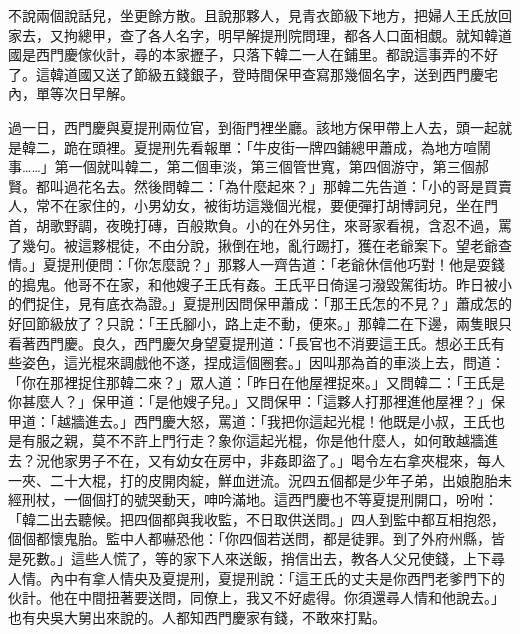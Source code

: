 不說兩個說話兒，坐更餘方散。且說那夥人，見青衣節級下地方，把婦人王氏放回家去，又拘總甲，查了各人名字，明早解提刑院問理，都各人口面相覷。就知韓道國是西門慶傢伙計，尋的本家攊子，只落下韓二一人在鋪里。都說這事弄的不好了。這韓道國又送了節級五錢銀子，登時間保甲查寫那幾個名字，送到西門慶宅內，單等次日早解。

過一日，西門慶與夏提刑兩位官，到衙門裡坐廳。該地方保甲帶上人去，頭一起就是韓二，跪在頭裡。夏提刑先看報單：「牛皮街一牌四鋪總甲蕭成，為地方喧鬧事……」第一個就叫韓二，第二個車淡，第三個管世寬，第四個游守，第三個郝賢。都叫過花名去。然後問韓二：「為什麼起來？」那韓二先告道：「小的哥是買賣人，常不在家住的，小男幼女，被街坊這幾個光棍，要便彈打胡博詞兒，坐在門首，胡歌野調，夜晚打磚，百般欺負。小的在外另住，來哥家看視，含忍不過，罵了幾句。被這夥棍徒，不由分說，揪倒在地，亂行踢打，獲在老爺案下。望老爺查情。」夏提刑便問：「你怎麼說？」那夥人一齊告道：「老爺休信他巧對！他是耍錢的搗鬼。他哥不在家，和他嫂子王氏有姦。王氏平日倚逞刁潑毀駕街坊。昨日被小的們捉住，見有底衣為證。」夏提刑因問保甲蕭成：「那王氏怎的不見？」蕭成怎的好回節級放了？只說：「王氏腳小，路上走不動，便來。」那韓二在下邊，兩隻眼只看著西門慶。良久，西門慶欠身望夏提刑道：「長官也不消要這王氏。想必王氏有些姿色，這光棍來調戲他不遂，捏成這個圈套。」因叫那為首的車淡上去，問道：「你在那裡捉住那韓二來？」眾人道：「昨日在他屋裡捉來。」又問韓二：「王氏是你甚麼人？」保甲道：「是他嫂子兒。」又問保甲：「這夥人打那裡進他屋裡？」保甲道：「越牆進去。」西門慶大怒，罵道：「我把你這起光棍！他既是小叔，王氏也是有服之親，莫不不許上門行走？象你這起光棍，你是他什麼人，如何敢越牆進去？況他家男子不在，又有幼女在房中，非姦即盜了。」喝令左右拿夾棍來，每人一夾、二十大棍，打的皮開肉綻，鮮血迸流。況四五個都是少年子弟，出娘胞胎未經刑杖，一個個打的號哭動天，呻吟滿地。這西門慶也不等夏提刑開口，吩咐：「韓二出去聽候。把四個都與我收監，不日取供送問。」四人到監中都互相抱怨，個個都懷鬼胎。監中人都嚇恐他：「你四個若送問，都是徒罪。到了外府州縣，皆是死數。」這些人慌了，等的家下人來送飯，捎信出去，教各人父兄使錢，上下尋人情。內中有拿人情央及夏提刑，夏提刑說：「這王氏的丈夫是你西門老爹門下的伙計。他在中間扭著要送問，同僚上，我又不好處得。你須還尋人情和他說去。」也有央吳大舅出來說的。人都知西門慶家有錢，不敢來打點。

